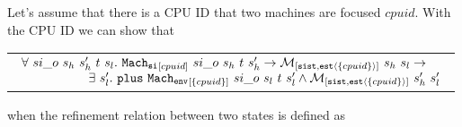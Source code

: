 \begin{lemma}
\label{lemma:chapter:conlink:one-step-single-refines-env}
Let's assume that there is a CPU ID that two machines are focused $cpuid$. With the CPU ID we can show that
\begin{center}
\begin{tabular}{P{0.95\textwidth}}
$
\begin{array}{l}
\forall \ si\_o \ s_h \ s_h' \ t \ s_l . \ \singlestep{cpuid}{si\_o}{s_h}{t}{s_h'} \rightarrow  \matchsinglestatestate{\set{cpuid}}{s_h}{s_l} \rightarrow \\
\ \ \ \ \ \ \ \ \ \ \ \ \ \ \ \ \exists\ s_l' . \  \ccplusstep{\envstep{\set{cpuid}}{si\_o}{s_l}{t}{s_l'}} \wedge  \matchsinglestatestate{\set{cpuid}}{s_h'}{s_l'}\\
\end{array}
$
\end{tabular}
when the refinement relation between two states is defined as
\end{center}
\begin{mathpar}
\end{mathpar}
\end{lemma}

